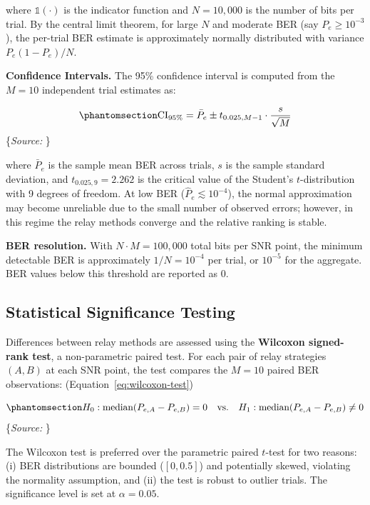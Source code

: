 \documentclass[
  english,
  12pt,
  12pt,
  a4paper,
  oneside]{report}
\begin{document}
where \(\mathbb{1}(\cdot)\) is the indicator function and \(N = 10{,}000\) is the number of bits per trial. By the central limit theorem, for large \(N\) and moderate BER (say \(P_e \geq 10^{-3}\)), the per-trial BER estimate is approximately normally distributed with variance \(P_e(1-P_e)/N\).

\textbf{Confidence Intervals.} The 95\% confidence interval is computed from the \(M = 10\) independent trial estimates as:

\begin{equation}\protect\phantomsection\label{eq:confidence-interval}{\text{CI}_{95\%} = \bar{P}_e \pm t_{0.025, M-1} \cdot \frac{s}{\sqrt{M}}
}\end{equation} \footnotesize\{\textit{Source: \1}\}\normalsize

where \(\bar{P}_e\) is the sample mean BER across trials, \(s\) is the sample standard deviation, and \(t_{0.025, 9} = 2.262\) is the critical value of the Student's \(t\)-distribution with 9 degrees of freedom. At low BER (\(\hat{P}_e \lesssim 10^{-4}\)), the normal approximation may become unreliable due to the small number of observed errors; however, in this regime the relay methods converge and the relative ranking is stable.

\textbf{BER resolution.} With \(N \cdot M = 100{,}000\) total bits per SNR point, the minimum detectable BER is approximately \(1/N = 10^{-4}\) per trial, or \(10^{-5}\) for the aggregate. BER values below this threshold are reported as 0.

\subsection{Statistical Significance Testing}\label{sec:statistical-significance-testing}

Differences between relay methods are assessed using the \textbf{Wilcoxon signed-rank test}, a non-parametric paired test. For each pair of relay strategies \((A, B)\) at each SNR point, the test compares the \(M = 10\) paired BER observations: (Equation~\ref{eq:wilcoxon-test})

\begin{equation}\protect\phantomsection\label{eq:wilcoxon-test}{H_0: \text{median}(P_{e,A} - P_{e,B}) = 0 \quad \text{vs.} \quad H_1: \text{median}(P_{e,A} - P_{e,B}) \neq 0
}\end{equation} \footnotesize\{\textit{Source: \1}\}\normalsize

The Wilcoxon test is preferred over the parametric paired \(t\)-test for two reasons: (i) BER distributions are bounded (\([0, 0.5]\)) and potentially skewed, violating the normality assumption, and (ii) the test is robust to outlier trials. The significance level is set at \(\alpha = 0.05\).
\end{document}
